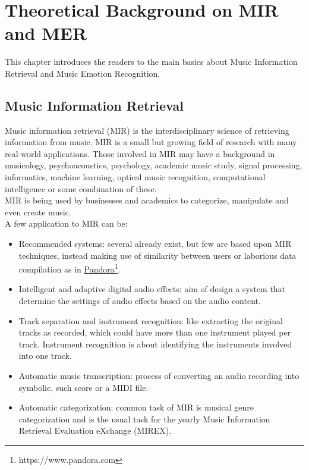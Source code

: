 \chapter{Theoretical Background on MIR and MER}
\label{chap:TheoreticalBackgroundMIRMER}
\thispagestyle{plain}

\vspace{0.5cm}

\noindent This chapter introduces the readers to the main basics about Music Information Retrieval and Music Emotion Recognition.

\section{Music Information Retrieval}
Music information retrieval (MIR) is the interdisciplinary science of retrieving information from music. MIR is a small but growing field of research with many real-world applications. Those involved in MIR may have a background in musicology, psychoacoustics, psychology, academic music study, signal processing, informatics, machine learning, optical music recognition, computational intelligence or some combination of these.
\\ \indent
MIR is being used by businesses and academics to categorize, manipulate and even create music.
\\
A few application to MIR can be:
\begin{itemize}
	\item Recommended systems: several already exist, but few are based upon MIR techniques, instead making use of similarity between users or laborious data compilation as in \href{https://www.pandora.com}{Pandora}\footnote{https://www.pandora.com}.
	\item Intelligent and adaptive digital audio effects: aim of design a system that determine the settings of audio effects based on the audio content.
	\item Track separation and instrument recognition: like extracting the original tracks as recorded, which could have more than one instrument played per track. Instrument recognition is about identifying the instruments involved into one track.
	\item Automatic music transcription: process of converting an audio recording into symbolic, such score or a MIDI file.
	\item Automatic categorization: common task of MIR is musical genre categorization and is the usual task for the yearly Music Information Retrieval Evaluation eXchange (MIREX).
\end{itemize}


